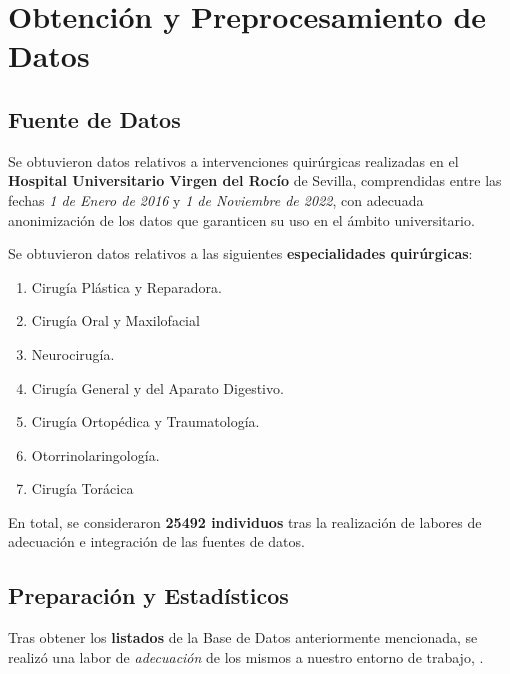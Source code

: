 
\section{Obtención y Preprocesamiento de Datos}

\subsection{Fuente de Datos}

Se obtuvieron datos relativos a intervenciones quirúrgicas realizadas en el \textbf{Hospital Universitario Virgen del Rocío} de Sevilla, comprendidas entre las fechas \textit{1 de Enero de 2016} y \textit{1 de Noviembre de 2022}, con adecuada anonimización de los datos que garanticen su uso en el ámbito universitario.

Se obtuvieron datos relativos a las siguientes \textbf{especialidades quirúrgicas}:
\begin{enumerate}
    \item Cirugía Plástica y Reparadora.
    \item Cirugía Oral y Maxilofacial
    \item Neurocirugía.
    \item Cirugía General y del Aparato Digestivo.
    \item Cirugía Ortopédica y Traumatología.
    \item Otorrinolaringología.
    \item Cirugía Torácica
\end{enumerate}


En total, se consideraron \textbf{25492 individuos} tras la realización de labores de adecuación e integración de las fuentes de datos.


 \subsection{Preparación y Estadísticos}

 Tras obtener los \textbf{listados} de la Base de Datos anteriormente mencionada, se realizó una labor de \textit{adecuación} de los mismos a nuestro entorno de trabajo, \cite{McKinney2010DataPython}.

